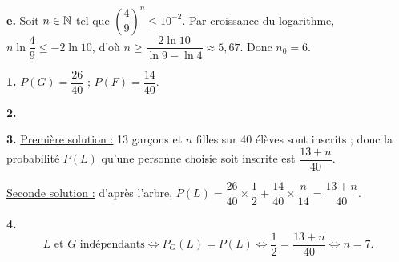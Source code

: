 \documentclass[11pt]{article}
\begin{document}
\textbf{e.} Soit $n \in \mathbb{N}$ tel que $\left(\dfrac{4}{9}\right)^n \le 10^{-2}$. Par croissance du logarithme, $n\ln\dfrac{4}{9} \le -2\ln 10$, d'où $n \ge \dfrac{2\ln 10}{\ln 9 - \ln 4} \approx 5{,}67$. Donc $n_0 = 6$.


\textbf{1.} $P(G) = \dfrac{26}{40}$ ; $P(F) = \dfrac{14}{40}$.

\textbf{2.} \begin{center}
\end{center}

\textbf{3.} \underline{Première solution :} 13 garçons et $n$ filles sur 40 élèves sont inscrits ; donc la probabilité $P(L)$ qu'une personne choisie soit inscrite est $\dfrac{13 + n}{40}$.

\underline{Seconde solution :} d'après l'arbre, $P(L) = \dfrac{26}{40} \times \dfrac{1}{2} + \dfrac{14}{40} \times \dfrac{n}{14} = \dfrac{13 + n}{40}$.

\textbf{4.}
\[ L \text{ et } G \text{ indépendants} \Longleftrightarrow P_G(L) = P(L) \Longleftrightarrow \frac{1}{2} = \frac{13 + n}{40} \Longleftrightarrow n = 7. \]
\end{document}
